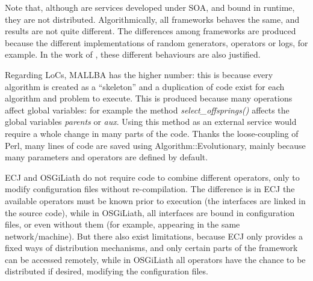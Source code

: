  Note that, although are services developed under SOA, and
bound in runtime, they are not distributed. Algorithmically, all
frameworks behaves the same, and results are not quite different. The
differences among frameworks are produced because the different
implementations of random generators, operators or logs, for
example. In the work of  \cite{PERL}, these
different behaviours are also justified. %



Regarding LoCs, MALLBA has the higher number: this is because every
algorithm is created as a ``skeleton'' and a duplication of code exist
for each algorithm and problem to execute. This is produced because
many operations affect global variables: for example the method {\em
  select\_offsprings()} affects the global variables {\em parents} or
{\em aux}. Using this method as an external service would require a
whole change in many parts of the code. Thanks the loose-coupling of
Perl, many lines of code are saved using Algorithm::Evolutionary,
mainly because many parameters and operators are defined by default. 



ECJ and OSGiLiath do not require code to combine different operators,
only to modify configuration files without re-compilation. %
The difference is in ECJ the available operators must be known prior
to execution (the interfaces are linked in the source code), while in
OSGiLiath, all interfaces are bound in configuration files, or even
without them (for example, appearing in the same network/machine). But
there also exist limitations, because ECJ only provides a fixed ways
of distribution mechanisms, and only certain parts of the framework
can be accessed remotely, while in OSGiLiath all operators have the
chance to be distributed if desired, modifying the configuration
files. 


